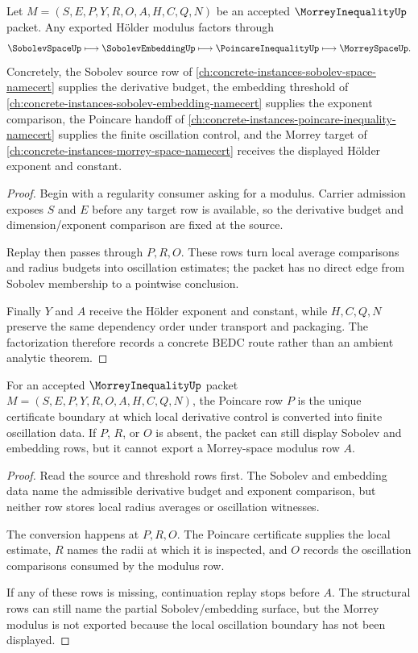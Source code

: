 \begin{theorem}
\label{thm:morrey-inequality-sobolev-modulus}
Let $M=(S,E,P,Y,R,O,A,H,C,Q,N)$ be an accepted $\MorreyInequalityUp$ packet. Any exported Hölder modulus factors through
$$
\SobolevSpaceUp \longmapsto \SobolevEmbeddingUp \longmapsto \PoincareInequalityUp \longmapsto \MorreySpaceUp .
$$
Concretely, the Sobolev source row of \autoref{ch:concrete-instances-sobolev-space-namecert} supplies the derivative budget, the embedding threshold of \autoref{ch:concrete-instances-sobolev-embedding-namecert} supplies the exponent comparison, the Poincare handoff of \autoref{ch:concrete-instances-poincare-inequality-namecert} supplies the finite oscillation control, and the Morrey target of \autoref{ch:concrete-instances-morrey-space-namecert} receives the displayed Hölder exponent and constant.
\end{theorem}
\begin{proof}
Begin with a regularity consumer asking for a modulus. Carrier admission exposes $S$ and $E$ before any target row is available, so the derivative budget and dimension/exponent comparison are fixed at the source.

Replay then passes through $P,R,O$. These rows turn local average comparisons and radius budgets into oscillation estimates; the packet has no direct edge from Sobolev membership to a pointwise conclusion.

Finally $Y$ and $A$ receive the Hölder exponent and constant, while $H,C,Q,N$ preserve the same dependency order under transport and packaging. The factorization therefore records a concrete BEDC route rather than an ambient analytic theorem.
\end{proof}

\begin{theorem}
\label{thm:morrey-inequality-poincare-handoff}
For an accepted $\MorreyInequalityUp$ packet $M=(S,E,P,Y,R,O,A,H,C,Q,N)$, the Poincare row $P$ is the unique certificate boundary at which local derivative control is converted into finite oscillation data. If $P$, $R$, or $O$ is absent, the packet can still display Sobolev and embedding rows, but it cannot export a Morrey-space modulus row $A$.
\end{theorem}
\begin{proof}
Read the source and threshold rows first. The Sobolev and embedding data name the admissible derivative budget and exponent comparison, but neither row stores local radius averages or oscillation witnesses.

The conversion happens at $P,R,O$. The Poincare certificate supplies the local estimate, $R$ names the radii at which it is inspected, and $O$ records the oscillation comparisons consumed by the modulus row.

If any of these rows is missing, continuation replay stops before $A$. The structural rows can still name the partial Sobolev/embedding surface, but the Morrey modulus is not exported because the local oscillation boundary has not been displayed.
\end{proof}

